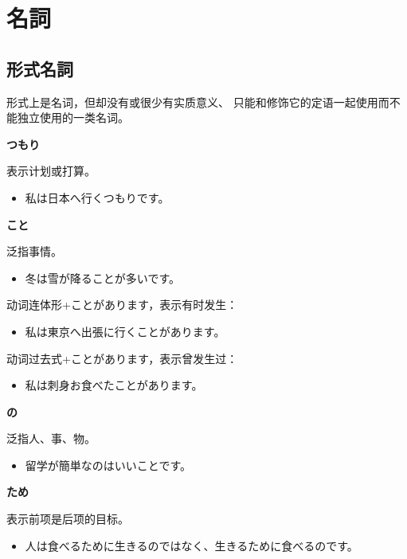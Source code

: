 \section{名詞}%

\subsection{形式名詞}%

形式上是名词，但却没有或很少有实质意义、
只能和修饰它的定语一起使用而不能独立使用的一类名词。

{\bf
\noindent つもり
}

表示计划或打算。
\begin{itemize}
  \item 私は日本へ行くつもりです。
\end{itemize}

{\bf
\noindent こと
}

泛指事情。
\begin{itemize}
  \item 冬は雪が降ることが多いです。
\end{itemize}

动词连体形+ことがあります，表示有时发生：
\begin{itemize}
  \item 私は東京へ出張に行くことがあります。
\end{itemize}

动词过去式+ことがあります，表示曾发生过：
\begin{itemize}
  \item 私は刺身お食べたことがあります。
\end{itemize}

{\bf
\noindent の
}

泛指人、事、物。
\begin{itemize}
  \item 留学が簡単なのはいいことです。
\end{itemize}

{\bf
\noindent ため
}

表示前项是后项的目标。
\begin{itemize}
  \item 人は食べるために生きるのではなく、生きるために食べるのです。
\end{itemize}
